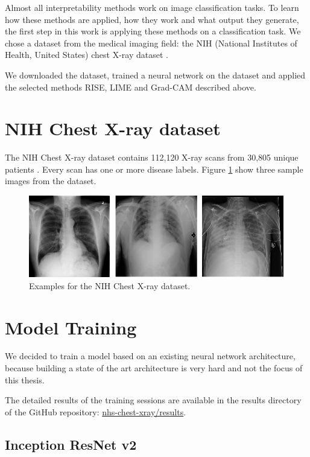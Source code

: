 Almost all interpretability methods work on image classification tasks. To learn how these methods are applied, how they work and what output they generate, the first step in this work is applying these methods on a classification task. We chose a dataset from the medical imaging field: the NIH (National Institutes of Health, United States) chest X-ray dataset \cite{wang2017chestx}.

We downloaded the dataset, trained a neural network on the dataset and applied the selected methods RISE, LIME and Grad-CAM described above.

\section{NIH Chest X-ray dataset}
The NIH Chest X-ray dataset contains 112,120 X-ray scans from 30,805 unique patients \cite{nihchestxraykaggle}. Every scan has one or more disease labels. Figure \ref{chest_xray_sample} show three sample images from the dataset.

\begin{figure}[h]
\centering
\includegraphics[width=14cm]{chapters/03_classification/images/chest-x-ray.png}
\caption{Examples for the NIH Chest X-ray dataset.}
\label{chest_xray_sample}
\end{figure}

\section{Model Training}
We decided to train a model based on an existing neural network architecture, because building a state of the art architecture is very hard and not the focus of this thesis.

The detailed results of the training sessions are available in the results directory of the GitHub repository: \href{https://github.com/andef4/thesis-code/tree/master/nhs-chest-xray/results/}{nhs-chest-xray/results}.

\subsection{Inception ResNet v2}

